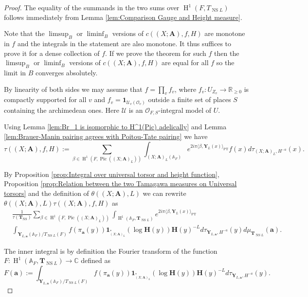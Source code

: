 \documentclass[a4paper,11pt,reqno]{amsart}
\newcommand{\R}{\mathbb{R}}
\newcommand{\C}{\mathbb{C}}
\newcommand{\A}{\mathbb{A}}
\DeclareMathOperator{\Pic}{Pic}
\DeclareMathOperator{\NS}{NS}
\DeclareMathOperator{\Eff}{\overline{Eff}}
\DeclareMathOperator{\HH}{H}
\theoremstyle{definition}
\begin{document}
\begin{proof}
	The equality of the summands in the two sums over $\HH^1(F, T_{\NS L})$ follows immediately from Lemma \ref{lem:Comparison Gauge and Height measure}.
	
	Note that the $\limsup_B$ or $\liminf_B$ versions of $c((X ; \mathbf{A}), f, H)$ are monotone in $f$ and the integrals in the statement are also monotone. It thus suffices to prove it for a dense collection of $f$. If we prove the theorem for such $f$ then the $\limsup_B$ or $\liminf_B$ versions of $c((X ; \mathbf{A}), f, H)$ are equal for all $f$ so the limit in $B$ converges absolutely.
	
	By linearity of both sides we may assume that $f = \prod_v f_v$, where $f_v: U_{Z_v} \to \R_{\geq 0}$ is compactly supported for all $v$ and $f_v = \mathbf{1}_{\mathcal{U}_v(\mathcal{O}_v)}$ outside a finite set of places $S$ containing the archimedean ones. Here $\mathcal{U}$ is an $\mathcal{O}_{F, S}$-integral model of $U$.
	
	Using Lemma \ref{lem:Br_1 is isomorphic to H^1(Pic) adelically} and Lemma \ref{lem:Brauer-Manin pairing agrees with Poitou-Tate pairing} we have 
	\[
	\tau((X ; \mathbf{A}), f, H) := \sum_{\beta \in \HH^1(F, \Pic((X ; \mathbf{A})_L))} \int_{(X; \mathbf{A})_L(\A_F)} e^{2 i \pi \langle \beta,  \mathbf{Y}_L(x) \rangle_{\text{PT}}} f(x) d\tau_{(X; \mathbf{A})_L, H^{-a}}(x).
	\]
	
	By Proposition \ref{prop:Integral over universal torsor and height function}, Proposition \ref{prop:Relation between the two Tamagawa measures on Universal torsors} and the definition of $\theta((X ; \mathbf{A}), L)$ we can rewrite $\theta((X ; \mathbf{A}), L) \tau((X ; \mathbf{A}), f, H)$ as 
	\begin{equation}\label{eq:poisson summation Brauer side}
		\begin{split}
			&\frac{1}{\tau(\mathbf{T}_{\NS})} \sum_{\beta \in \HH^1(F, \Pic((X ; \mathbf{A})_L))} \int_{\HH^1(\A_F, \mathbf{T}_{\NS L})} e^{2 i \pi \langle \beta, \mathbf{Y}_L(x) \rangle_{\text{PT}}} \\
			&\int_{\mathbf{Y}_{L, \mathbf{a}}(\A_F)/T_{\NS L}(F)} f(\pi_{\mathbf{a}}(y)) 
			\mathbf{1}_{\Eff_{(X; \mathbf{A})_L}^*}(\log \mathbf{H}(y)) \mathbf{H}(y)^{- L}
			d\tau_{\mathbf{Y}_{L, \mathbf{a}}, H^{-a}}(y) 
			d\mu_{\mathbf{T}_{\NS L}}(\mathbf{a}).
		\end{split}
	\end{equation}

	The inner integral is by definition the Fourier transform of the function $F: \HH^1(\A_F, \mathbf{T}_{\NS L}) \to \C$ defined as
	\[
	F(\mathbf{a}) := \int_{\mathbf{Y}_{L, \mathbf{a}}(\A_F)/T_{\NS L}(F)} f(\pi_{\mathbf{a}}(y)) 
	\mathbf{1}_{\Eff_{(X; \mathbf{A})_L}^*}(\log \mathbf{H}(y)) \mathbf{H}(y)^{- L}
	d\tau_{\mathbf{Y}_{L, \mathbf{a}}, H^{-a}}(y).
	\]


\end{proof}
\end{document}
